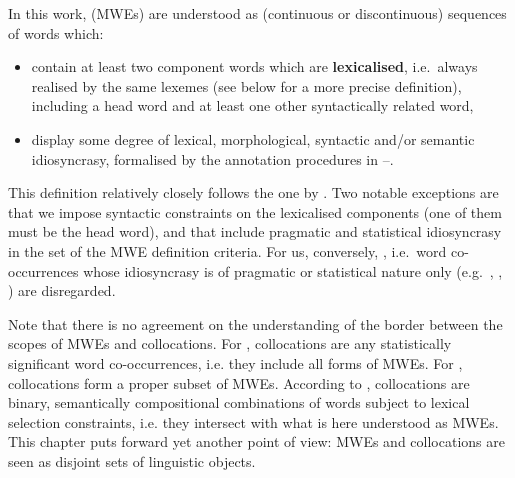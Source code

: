 \documentclass[output=paper,
modfonts,
]{langscibook}
\begin{document}
\noindent
In this work,  (MWEs) are understood as (continuous or discontinuous) sequences of words which: 
\begin{itemize}
\item contain at least two component words which are \textbf{lexicalised}, i.e.\ always realised by the same lexemes (see below for a more precise definition),
including a head word and at least one other syntactically related word, 
\item display some degree of {lexical}, morphological, syntactic and/or semantic idiosyncrasy, formalised by the annotation procedures in --.
\end{itemize}
This definition relatively closely follows the one by \citet{baldwin2010multiword}. Two notable exceptions are that we impose syntactic constraints on the lexicalised components (one of them must be the head word), and that \citet{baldwin2010multiword} include {pragmatic and} statistical idiosyncrasy in the set of the MWE definition criteria. For us, conversely, , i.e.\ word co-occurrences whose idiosyncrasy is of {pragmatic or} statistical nature only (e.g.\ , , ) are disregarded. %

Note that there is no agreement on the understanding of the border between the scopes of MWEs and collocations. For \citet{Sag2002a}, collocations are any statistically significant word co-occurrences, i.e. they include all forms of MWEs. For \citet{baldwin2010multiword}, collocations form a proper subset of MWEs. According to \citet{Melcuk10}, collocations are binary, semantically compositional combinations of words subject to lexical selection constraints, i.e. they intersect with what is here understood as MWEs. This chapter puts forward yet another point of view: MWEs and collocations are seen as disjoint sets of linguistic objects.
\end{document}
